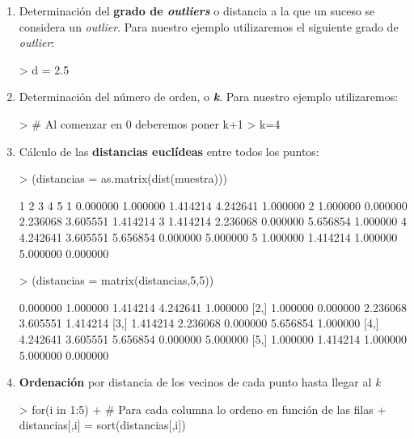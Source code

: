 \documentclass [a4paper] {article}
\begin{document}
\begin{enumerate}
	\item Determinación del \textbf{grado de \textit{outliers}} o distancia a la que un suceso se
		  considera un \textit{outlier}. Para nuestro ejemplo utilizaremos el siguiente grado
	      de \textit{outlier}:
\begin{Schunk}
\begin{Sinput}
> d = 2.5
\end{Sinput}
\end{Schunk}
	\item Determinación del número de orden, o \textbf{\textit{k}}. Para nuestro ejemplo utilizaremos:
\begin{Schunk}
\begin{Sinput}
> # Al comenzar en 0 deberemos poner k+1
> k=4
\end{Sinput}
\end{Schunk}
	\item Cálculo de las \textbf{distancias euclídeas} entre todos los puntos:
\begin{Schunk}
\begin{Sinput}
> (distancias = as.matrix(dist(muestra)))
\end{Sinput}
\begin{Soutput}
         1        2        3        4        5
1 0.000000 1.000000 1.414214 4.242641 1.000000
2 1.000000 0.000000 2.236068 3.605551 1.414214
3 1.414214 2.236068 0.000000 5.656854 1.000000
4 4.242641 3.605551 5.656854 0.000000 5.000000
5 1.000000 1.414214 1.000000 5.000000 0.000000
\end{Soutput}
\begin{Sinput}
> (distancias = matrix(distancias,5,5))
\end{Sinput}
\begin{Soutput}
         [,1]     [,2]     [,3]     [,4]     [,5]
[1,] 0.000000 1.000000 1.414214 4.242641 1.000000
[2,] 1.000000 0.000000 2.236068 3.605551 1.414214
[3,] 1.414214 2.236068 0.000000 5.656854 1.000000
[4,] 4.242641 3.605551 5.656854 0.000000 5.000000
[5,] 1.000000 1.414214 1.000000 5.000000 0.000000
\end{Soutput}
\end{Schunk}
	\item \textbf{Ordenación} por distancia de los vecinos de cada punto hasta llegar al \textit{k}
\begin{Schunk}
\begin{Sinput}
> for(i in 1:5)
+     # Para cada columna lo ordeno en función de las filas
+ 	distancias[,i] = sort(distancias[,i])

\end{Sinput}
\end{Schunk}
\end{enumerate}
\end{document}

